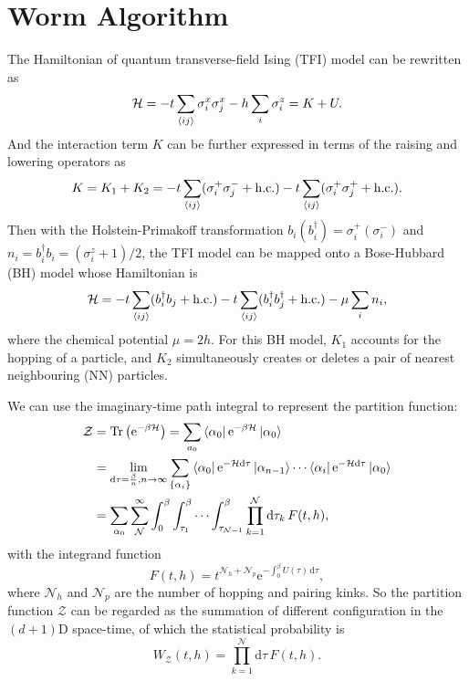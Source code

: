 \documentclass{article}
\DeclareMathOperator{\Tr}{Tr}
\theoremstyle{plain} \newtheorem{thm}{Theorem}[section]
\theoremstyle{definition} \newtheorem{df}{Definition}[section]
\theoremstyle{definition} \newtheorem{eg}{Example}
\theoremstyle{remark} \newtheorem*{rmk}{Remark}
\begin{document}
\section{Worm Algorithm}
The Hamiltonian of quantum transverse-field Ising (TFI) model can be rewritten as
\begin{equation}
  \mathcal{H} = -t\sum_{\braket{ij}}\sigma_i^x\sigma_j^x - h\sum_{i}\sigma_i^z = K+U.
\end{equation}
And the interaction term $K$ can be further expressed in terms of the raising and lowering operators as
\begin{equation}
  K = K_1+K_2 = -t\sum_{\braket{ij}}(\sigma_i^+\sigma_j^-+\text{h.c.})-t\sum_{\braket{ij}}(\sigma_i^+\sigma_j^++\text{h.c.}).
\end{equation}
Then with the Holstein-Primakoff transformation $b_i(b_i^\dag) = \sigma_i^+(\sigma_i^-)$ and $n_i = b_i^\dag b_i = (\sigma_i^z+1)/2$, the TFI model can be mapped onto a Bose-Hubbard (BH) model whose Hamiltonian is
\begin{equation}
  \mathcal{H} = -t\sum_{\braket{ij}}(b_i^\dag b_j+\text{h.c.})-t\sum_{\braket{ij}}(b_i^\dag b_j^\dag+\text{h.c.})-\mu\sum_{i}n_i, 
\end{equation}
where the chemical potential $\mu = 2h$. For this BH model, $K_1$ accounts for the hopping of a particle, and $K_2$ simultaneously creates or deletes a pair of nearest neighbouring (NN) particles.

We can use the imaginary-time path integral to represent the partition function: 
\begin{align}
  \mathcal{Z} &= \Tr \left(\mathrm{e}^{-\beta \mathcal{H}}\right) = \sum_{a_0}\bra{\alpha_0}\mathrm{e}^{-\beta \mathcal{H}}\ket{\alpha_0}\\
              &= \lim_{\mathrm{d}\tau = \frac{\beta}{n}, n \to \infty} \sum_{\{\alpha_i\}}\bra{\alpha_0}\mathrm{e}^{-\mathcal{H}\mathrm{d}\tau}\ket{\alpha_{n-1}}\cdots \bra{\alpha_i}\mathrm{e}^{-\mathcal{H}\mathrm{d}\tau}\ket{\alpha_0}\\
              &= \sum_{\alpha_0}\sum_{\mathcal{N}}^{\infty}\int_{0}^{\beta}\int_{\tau_1}^{\beta}\cdots \int_{\tau_{\mathcal{N}-1}}^{\beta} \prod_{k=1}^{\mathcal{N}}\mathrm{d}\tau_k\,F(t, h),
\end{align}
with the integrand function
\begin{equation}
  F(t, h) = t^{\mathcal{N}_h+\mathcal{N}_p}\mathrm{e}^{-\int_{0}^{\beta}U(\tau)\,\mathrm{d}\tau},
  \label{eq:integrand}
\end{equation}
where $\mathcal{N}_h$ and $\mathcal{N}_p$ are the number of hopping and pairing kinks. So the partition function $\mathcal{Z}$ can be regarded as the summation of different configuration in the $(d+1)$D space-time, of which the statistical probability is
\begin{equation}
  W_{\mathcal{Z}}(t, h) = \prod_{k=1}^{\mathcal{N}}\mathrm{d}\tau\,F(t, h).
\end{equation}
\end{document}
